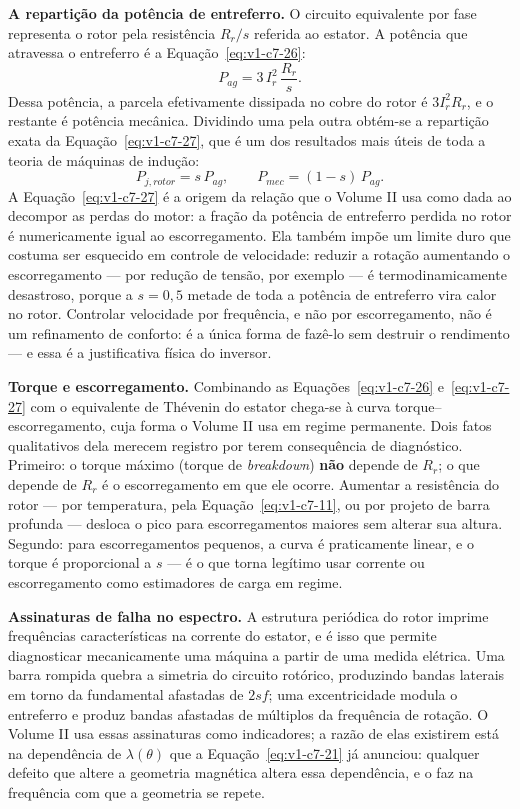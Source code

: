 \documentclass[12pt,a4paper]{article}
\numberwithin{equation}{section}
\numberwithin{table}{section}
\numberwithin{figure}{section}
\begin{document}
\textbf{A repartição da potência de entreferro.} O circuito equivalente por
fase representa o rotor pela resistência $R_r/s$ referida ao estator. A
potência que atravessa o entreferro é a Equação~\eqref{eq:v1-c7-26}:
\begin{equation}\label{eq:v1-c7-26}
P_{ag} = 3\,I_r^{2}\,\frac{R_r}{s} .
\end{equation}
Dessa potência, a parcela efetivamente dissipada no cobre do rotor é
$3I_r^2R_r$, e o restante é potência mecânica. Dividindo uma pela outra
obtém-se a repartição exata da Equação~\eqref{eq:v1-c7-27}, que é um dos
resultados mais úteis de toda a teoria de máquinas de indução:
\begin{equation}\label{eq:v1-c7-27}
P_{j,rotor} = s\,P_{ag},
\qquad
P_{mec} = (1-s)\,P_{ag} .
\end{equation}
A Equação~\eqref{eq:v1-c7-27} é a origem da relação que o Volume II usa como
dada ao decompor as perdas do motor: a fração da potência de entreferro perdida
no rotor é numericamente igual ao escorregamento. Ela também impõe um limite
duro que costuma ser esquecido em controle de velocidade: reduzir a rotação
aumentando o escorregamento --- por redução de tensão, por exemplo --- é
termodinamicamente desastroso, porque a $s = 0{,}5$ metade de toda a potência
de entreferro vira calor no rotor. Controlar velocidade por frequência, e não
por escorregamento, não é um refinamento de conforto: é a única forma de fazê-lo
sem destruir o rendimento --- e essa é a justificativa física do inversor.

\textbf{Torque e escorregamento.} Combinando as
Equações~\eqref{eq:v1-c7-26} e~\eqref{eq:v1-c7-27} com o equivalente de
Thévenin do estator chega-se à curva torque--escorregamento, cuja forma o
Volume II usa em regime permanente. Dois fatos qualitativos dela merecem
registro por terem consequência de diagnóstico. Primeiro: o torque máximo
(torque de \emph{breakdown}) \textbf{não} depende de $R_r$; o que depende de
$R_r$ é o escorregamento em que ele ocorre. Aumentar a resistência do rotor
--- por temperatura, pela Equação~\eqref{eq:v1-c7-11}, ou por projeto de barra
profunda --- desloca o pico para escorregamentos maiores sem alterar sua
altura. Segundo: para escorregamentos pequenos, a curva é praticamente linear,
e o torque é proporcional a $s$ --- é o que torna legítimo usar corrente ou
escorregamento como estimadores de carga em regime.

\textbf{Assinaturas de falha no espectro.} A estrutura periódica do rotor
imprime frequências características na corrente do estator, e é isso que
permite diagnosticar mecanicamente uma máquina a partir de uma medida elétrica.
Uma barra rompida quebra a simetria do circuito rotórico, produzindo bandas
laterais em torno da fundamental afastadas de $2sf$; uma excentricidade
modula o entreferro e produz bandas afastadas de múltiplos da frequência de
rotação. O Volume II usa essas assinaturas como indicadores; a razão de elas
existirem está na dependência de $\lambda(\theta)$ que a
Equação~\eqref{eq:v1-c7-21} já anunciou: qualquer defeito que altere a
geometria magnética altera essa dependência, e o faz na frequência com que a
geometria se repete.
\end{document}
